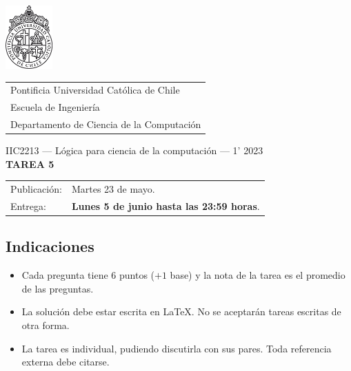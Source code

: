 \documentclass{article}
\begin{document}
\includegraphics[width=1.8cm]{uc.png}
\vspace*{-1.9cm}

\hspace*{2.1cm}
 \begin{tabular}{l}
  \sc Pontificia Universidad Católica de Chile \\
  \sc Escuela de Ingeniería \\
  \sc Departamento de Ciencia de la Computación
 \end{tabular}
 \bigskip

\vspace*{5mm}
\begin{center}
{IIC2213 --- Lógica para ciencia de la computación --- 1' 2023} \\
\vspace{3mm}
{\Large\bf TAREA 5} \\
\vspace{2mm}
\end{center}

\begin{tabular}{ll}
Publicación: & Martes 23 de mayo. \\
Entrega: & \textbf{Lunes 5 de junio hasta las 23:59 horas}. \\
\end{tabular}

\subsection*{Indicaciones}

\begin{itemize}
\item Cada pregunta tiene 6 puntos ($+1$ base) y la nota de la tarea es el promedio de  las preguntas.
\item La solución debe estar escrita en \LaTeX. No se aceptarán tareas escritas de otra forma.
\item La tarea es individual, pudiendo discutirla con sus pares. Toda referencia externa debe citarse.
\end{itemize}
\end{document}
